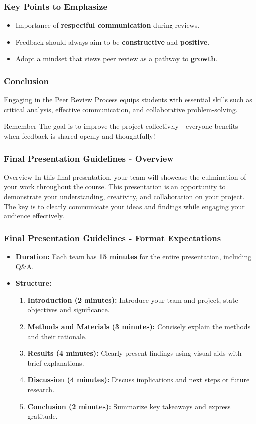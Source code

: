 \documentclass[aspectratio=169]{beamer}
\begin{document}
\begin{frame}[fragile]
  \frametitle{Key Points to Emphasize}
  \begin{itemize}
    \item Importance of \textbf{respectful communication} during reviews.
    \item Feedback should always aim to be \textbf{constructive} and \textbf{positive}.
    \item Adopt a mindset that views peer review as a pathway to \textbf{growth}.
  \end{itemize}
\end{frame}

\begin{frame}[fragile]
  \frametitle{Conclusion}
  Engaging in the Peer Review Process equips students with essential skills such as critical analysis, effective communication, and collaborative problem-solving. 
  \begin{block}{Remember}
    The goal is to improve the project collectively—everyone benefits when feedback is shared openly and thoughtfully!
  \end{block}
\end{frame}

\begin{frame}[fragile]
    \frametitle{Final Presentation Guidelines - Overview}
    \begin{block}{Overview}
        In this final presentation, your team will showcase the culmination of your work throughout the course. 
        This presentation is an opportunity to demonstrate your understanding, creativity, and collaboration on your project. 
        The key is to clearly communicate your ideas and findings while engaging your audience effectively.
    \end{block}
\end{frame}

\begin{frame}[fragile]
    \frametitle{Final Presentation Guidelines - Format Expectations}
    \begin{itemize}
        \item \textbf{Duration:} Each team has \textbf{15 minutes} for the entire presentation, including Q\&A.
        \item \textbf{Structure:}
        \begin{enumerate}
            \item \textbf{Introduction (2 minutes):} Introduce your team and project, state objectives and significance.
            \item \textbf{Methods and Materials (3 minutes):} Concisely explain the methods and their rationale.
            \item \textbf{Results (4 minutes):} Clearly present findings using visual aids with brief explanations.
            \item \textbf{Discussion (4 minutes):} Discuss implications and next steps or future research.
            \item \textbf{Conclusion (2 minutes):} Summarize key takeaways and express gratitude.
        \end{enumerate}
    \end{itemize}
\end{frame}
\end{document}
